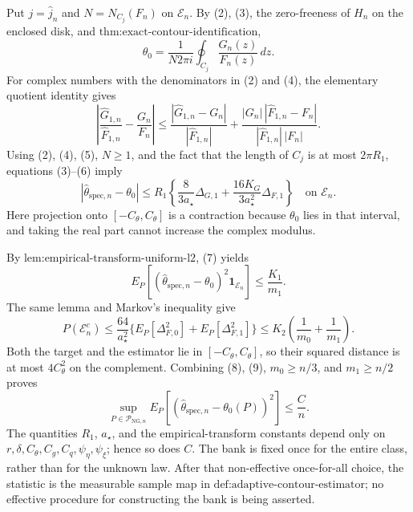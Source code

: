 Put \(j=\widehat j_n\) and \(N=N_{C_j}(F_n)\) on \(\mathcal E_n\).  By (2), (3), the zero-freeness of \(H_n\) on the enclosed disk, and
\(\text{thm:exact-contour-identification}\),
\[
 \theta_0
 =\frac{1}{N2\pi i}\oint_{C_j}\frac{G_n(z)}{F_n(z)}\,dz. \tag{6}
\]
For complex numbers with the denominators in (2) and (4), the elementary quotient identity gives
\[
 \left|\frac{\widehat G_{1,n}}{\widehat F_{1,n}}-
             \frac{G_n}{F_n}\right|
 \le
 \frac{|\widehat G_{1,n}-G_n|}{|\widehat F_{1,n}|}
 +\frac{|G_n|\,|\widehat F_{1,n}-F_n|}
       {|\widehat F_{1,n}|\,|F_n|}.
\]
Using (2), (4), (5), \(N\ge1\), and the fact that the length of \(C_j\) is at most \(2\pi R_1\), equations (3)--(6) imply
\[
 |\widehat\theta_{\mathrm{spec},n}-\theta_0|
 \le R_1\left\{
       \frac{8}{3a_{\star}}\Delta_{G,1}
       +\frac{16K_G}{3a_{\star}^2}\Delta_{F,1}
     \right\}
 \quad\text{on }\mathcal E_n. \tag{7}
\]
Here projection onto \([-C_{\theta},C_{\theta}]\) is a contraction because
\(\theta_0\) lies in that interval, and taking the real part cannot increase the complex modulus.

By \(\text{lem:empirical-transform-uniform-l2}\), (7) yields
\[
 E_P\!\left[(\widehat\theta_{\mathrm{spec},n}-\theta_0)^2
             \mathbf 1_{\mathcal E_n}\right]
 \le \frac{K_1}{m_1}. \tag{8}
\]
The same lemma and Markov's inequality give
\[
 P(\mathcal E_n^c)
 \le\frac{64}{a_{\star}^2}
     \{E_P[\Delta_{F,0}^2]+E_P[\Delta_{F,1}^2]\}
 \le K_2\left(\frac1{m_0}+\frac1{m_1}\right). \tag{9}
\]
Both the target and the estimator lie in \([-C_{\theta},C_{\theta}]\), so their squared distance is at most \(4C_{\theta}^2\) on the complement.  Combining (8), (9), \(m_0\ge n/3\), and \(m_1\ge n/2\) proves
\[
 \sup_{P\in\mathcal P_{\mathrm{NG},n}}
 E_P[(\widehat\theta_{\mathrm{spec},n}-\theta_0(P))^2]
 \le\frac Cn. \tag{10}
\]
The quantities \(R_1\), \(a_{\star}\), and the empirical-transform constants depend only on
\(r,\delta,C_{\theta},C_g,C_q,\psi_{\eta},\psi_{\xi}\); hence so does \(C\).  The bank is fixed once for the entire class, rather than for the unknown law.  After that non-effective once-for-all choice, the statistic is the measurable sample map in
\(\text{def:adaptive-contour-estimator}\); no effective procedure for constructing the bank is being asserted.

